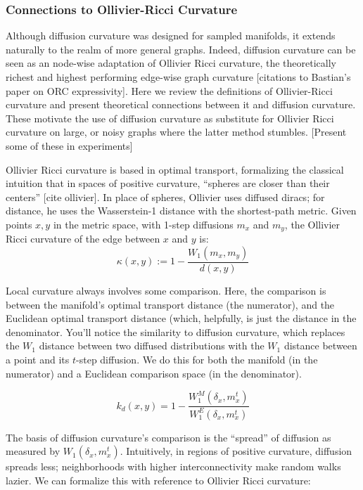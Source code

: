 \documentclass[
]{agujournal2019}
\begin{document}
\subsubsection{Connections to Ollivier-Ricci
Curvature}\label{connections-to-ollivier-ricci-curvature}

Although diffusion curvature was designed for sampled manifolds, it
extends naturally to the realm of more general graphs. Indeed, diffusion
curvature can be seen as an node-wise adaptation of Ollivier Ricci
curvature, the theoretically richest and highest performing edge-wise
graph curvature {[}citations to Bastian's paper on ORC expressivity{]}.
Here we review the definitions of Ollivier-Ricci curvature and present
theoretical connections between it and diffusion curvature. These
motivate the use of diffusion curvature as substitute for Ollivier Ricci
curvature on large, or noisy graphs where the latter method stumbles.
{[}Present some of these in experiments{]}

Ollivier Ricci curvature is based in optimal transport, formalizing the
classical intuition that in spaces of positive curvature, ``spheres are
closer than their centers'' {[}cite ollivier{]}. In place of spheres,
Ollivier uses diffused diracs; for distance, he uses the Wasserstein-1
distance with the shortest-path metric. Given points \(x,y\) in the
metric space, with 1-step diffusions \(m_{x}\) and \(m_{y}\), the
Ollivier Ricci curvature of the edge between \(x\) and \(y\) is:
\[\kappa(x, y):=1-\frac{W_1\left(m_x, m_y\right)}{d(x, y)}\]

Local curvature always involves some comparison. Here, the comparison is
between the manifold's optimal transport distance (the numerator), and
the Euclidean optimal transport distance (which, helpfully, is just the
distance in the denominator. You'll notice the similarity to diffusion
curvature, which replaces the \(W_{1}\) distance between two diffused
distributions with the \(W_{1}\) distance between a point and its
\(t\)-step diffusion. We do this for both the manifold (in the
numerator) and a Euclidean comparison space (in the denominator).

\[
k_{d}(x,y) = 1 - \frac{W_{1}^M(\delta_{x}, m_{x}^t)}{W_{1}^E(\delta_{x},m_{x}^t)}
\]

The basis of diffusion curvature's comparison is the ``spread'' of
diffusion as measured by \(W_{1}(\delta_{x},m_{x}^t)\). Intuitively, in
regions of positive curvature, diffusion spreads less; neighborhoods
with higher interconnectivity make random walks lazier. We can formalize
this with reference to Ollivier Ricci curvature:
\end{document}
